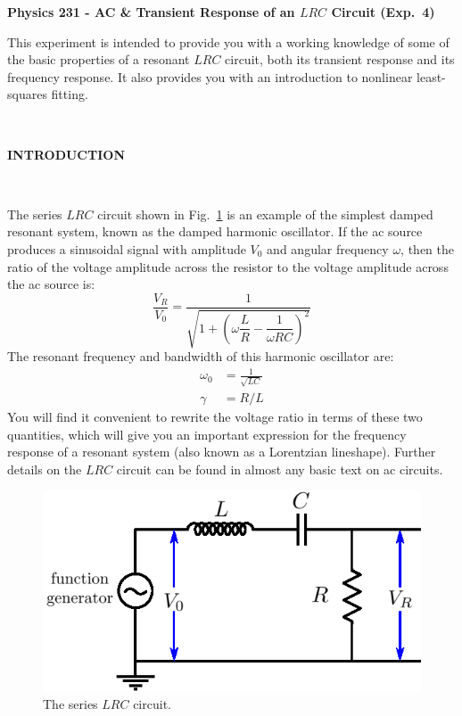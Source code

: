 \documentclass[12pt,oneside,openany,letterpaper]{article}
\begin{document}
\thispagestyle{plain}
\begin{center}
{\large{\bf{\selectfont Physics 231 - AC \& Transient Response of an $LRC$ Circuit (Exp.~4)}}}
\end{center}

\noindent This experiment is intended to provide you with a working knowledge of some of the basic properties of a resonant $LRC$ circuit, both its transient response and its frequency response. It also provides you with an introduction to nonlinear least-squares fitting.

~


{\bf INTRODUCTION}

~

\noindent The series $LRC$ circuit shown in Fig.~\ref{fig:fig1} is an example of the simplest damped resonant system, known as the damped harmonic oscillator. If the ac source produces a sinusoidal signal with amplitude $V_0$ and angular frequency $\omega$, then the ratio of the voltage amplitude across the resistor to the voltage amplitude across the ac source is:
\begin{equation}
\frac{V_R}{V_0}=\frac{1}{\sqrt{1+\left(\omega\dfrac{L}{R}-\dfrac{1}{\omega RC}\right)^2}}\label{eq:peak}
\end{equation}
The resonant frequency and bandwidth of this harmonic oscillator are:
\begin{align}
\omega_0&=\frac{1}{\sqrt{LC}}\\
\gamma&=R/L
\end{align}
You will find it convenient to rewrite the voltage ratio in terms of these two quantities, which will give you an important expression for the frequency response of a resonant system (also known as a Lorentzian lineshape).  Further details on the $LRC$ circuit can be found in almost any basic text on ac circuits.
\begin{figure}[b!]
\begin{center}
\includegraphics[width=.58\textwidth]{LRC.eps}\caption{\label{fig:fig1}The series $LRC$ circuit.}
\end{center}
\end{figure}
\clearpage
\end{document}
